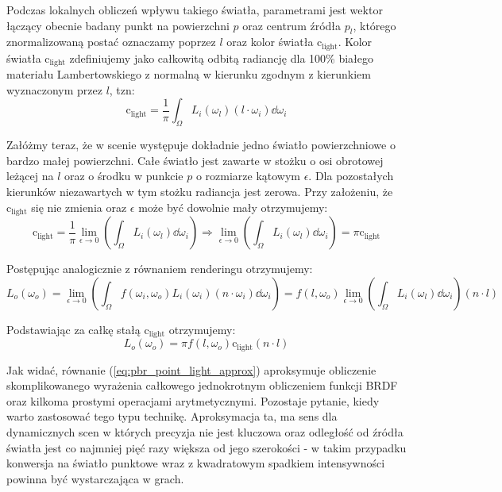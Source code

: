 \documentclass[../main.tex]{subfiles}
\newcommand{\clightcolor}{\text{c}_{\text{light}}}
\begin{document}
Podczas lokalnych obliczeń wpływu takiego światła, parametrami jest wektor łączący obecnie badany punkt na powierzchni $p$ oraz centrum źródła $p_l$, którego znormalizowaną postać oznaczamy poprzez $l$ oraz kolor światła $\clightcolor$. Kolor światła $\clightcolor$ zdefiniujemy jako całkowitą odbitą radiancję dla 100\% białego materiału Lambertowskiego z normalną w kierunku zgodnym z kierunkiem wyznaczonym przez $l$, tzn:
\begin{equation}
	\clightcolor = \frac{1}{\pi} \int_{\Omega} { L_i(\omega_l) (l \cdot \omega_i) \dd\omega_i }
\end{equation}

Załóżmy teraz, że w scenie występuje dokładnie jedno światło powierzchniowe o bardzo małej powierzchni. Całe światło jest zawarte w stożku o osi obrotowej leżącej na $l$ oraz o środku w punkcie $p$ o rozmiarze kątowym $\epsilon$. Dla pozostałych kierunków niezawartych w tym stożku radiancja jest zerowa. Przy założeniu, że $\clightcolor$ się nie zmienia oraz $\epsilon$ może być dowolnie mały otrzymujemy:
\begin{equation}
	\clightcolor = \frac{1}{\pi} \lim_{\epsilon \rightarrow 0} \left(
		\int_{\Omega} { L_i(\omega_l) } \dd\omega_i
	\right)
	\Rightarrow
	\lim_{\epsilon \rightarrow 0} \left(\int_{\Omega} { L_i(\omega_l) } \dd\omega_i \right) = \pi\clightcolor
\end{equation}

Postępując analogicznie z równaniem renderingu otrzymujemy:
\begin{equation}
	L_o(\omega_o) = \lim_{\epsilon \rightarrow 0} \left(
		\int_{\Omega}{ f(\omega_i, \omega_o) L_i(\omega_i) (n \cdot \omega_i) } \dd\omega_i
	\right) =
	 f(l, \omega_o) \lim_{\epsilon \rightarrow 0} \left(
	 	\int_{\Omega} { L_i(\omega_l) } \dd\omega_i
	 \right)
	 (n \cdot l)
\end{equation}

Podstawiając za całkę stałą $\clightcolor$ otrzymujemy:
\begin{equation}
	L_o(\omega_o) = \pi f(l, \omega_o) \clightcolor (n \cdot l)
    \label{eq:pbr_point_light_approx}
\end{equation}

Jak widać, równanie (\ref{eq:pbr_point_light_approx}) aproksymuje obliczenie skomplikowanego wyrażenia całkowego jednokrotnym obliczeniem funkcji BRDF oraz kilkoma prostymi operacjami arytmetycznymi. Pozostaje pytanie, kiedy warto zastosować tego typu technikę. Aproksymacja ta, ma sens dla dynamicznych scen w których precyzja nie jest kluczowa oraz odległość od źródła światła jest co najmniej pięć razy większa od jego szerokości \cite{RealTimeRendering2008,lambert_photometria} - w takim przypadku konwersja na światło punktowe wraz z kwadratowym spadkiem intensywności powinna być wystarczająca w grach.
\end{document}
